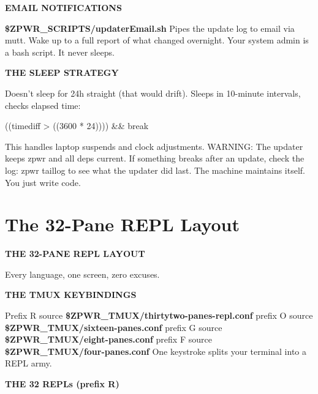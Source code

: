 \documentclass[11pt,a4paper,twoside]{book}
\begin{document}
\vspace{12pt}
{\bfseries\color{neonyellow} EMAIL NOTIFICATIONS}\vspace{4pt}

\textbf{\$ZPWR\_SCRIPTS/updaterEmail.sh} Pipes the update log to email via mutt. Wake up to a full report of what changed overnight. Your system admin is a bash script. It never sleeps.


\vspace{12pt}
{\bfseries\color{neonyellow} THE SLEEP STRATEGY}\vspace{4pt}

Doesn't sleep for 24h straight (that would drift). Sleeps in 10-minute intervals, checks elapsed time:

\begin{codebox}
\color{neongreen}((timediff > ((3600 * 24)))) \&\& break\\
\end{codebox}

This handles laptop suspends and clock adjustments. WARNING: The updater keeps zpwr and all deps current. If something breaks after an update, check the log: zpwr taillog  to see what the updater did last. The machine maintains itself. You just write code.


\vspace{16pt}

\section{The 32-Pane REPL Layout}


\vspace{10pt}
{\large\bfseries\color{neoncyan} THE 32-PANE REPL LAYOUT}\vspace{6pt}

Every language, one screen, zero excuses.


\vspace{12pt}
{\bfseries\color{neonyellow} THE TMUX KEYBINDINGS}\vspace{4pt}

Prefix R  source \textbf{\$ZPWR\_TMUX/thirtytwo-panes-repl.conf} prefix O  source \textbf{\$ZPWR\_TMUX/sixteen-panes.conf} prefix G  source \textbf{\$ZPWR\_TMUX/eight-panes.conf} prefix F  source \textbf{\$ZPWR\_TMUX/four-panes.conf} One keystroke splits your terminal into a REPL army.


\vspace{12pt}
{\bfseries\color{neonyellow} THE 32 REPLs (prefix R)}\vspace{4pt}
\end{document}
